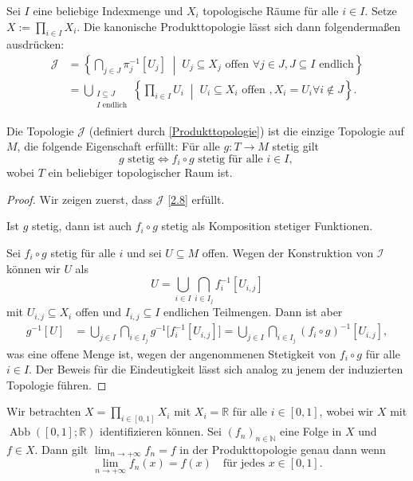\documentclass[
12pt, 
openany, 
a4paper, 
final,
fleqn, 
]{myclass}
\numberwithin{equation}{chapter}
\numberwithin{section}{chapter}
\newcommand{\NN}{\mathbb N}
\newcommand{\RR}{\mathbb R}
\newcommand{\varI}{\mathcal I}
\newcommand{\varJ}{\mathcal J}
\newcommand{\union}{\bigcup}
\newcommand{\intersect}{\bigcap}
\newcommand{\set}[2]{\left\{#1\;\middle|\;#2\right\}}
\DeclareMathOperator{\abb}{Abb}
\begin{document}
\begin{rmk}
Sei $I$ eine beliebige Indexmenge und $X_i$ topologische Räume für alle $i\in I$. Setze $X:= \prod_{i\in I} X_i$. Die kanonische Produkttopologie lässt sich dann folgendermaßen ausdrücken: 
\begin{align*}
\varJ
&
= \set{		\bigcap_{j\in J} \pi_{j}^{-1}[U_{j}]}{U_{j}\subseteq X_{j}\text{ offen }\forall j\in J, J\subseteq I\text{ endlich}}\\
&
= \union_{\substack{I\subseteq J\\\text{$I$ endlich}}}\set{\prod_{i\in I} U_i}{U_i\subseteq X_i \text{ offen }, X_i = U_i \forall i\notin J}.
\end{align*}
\end{rmk}

\begin{thr}\label{2.7}
Die Topologie $\varJ$ (definiert durch \eqref{Produkttopologie}) ist die einzige Topologie auf $M$, die folgende Eigenschaft erfüllt: Für alle $g: T \to M$ stetig gilt 
\begin{equation}\label{2.8}
\text{$g$ stetig} \iff f_{i}\circ g \text{ stetig für alle $i\in I$, }
\end{equation}
wobei $T$ ein beliebiger topologischer Raum ist. 
\end{thr}

\begin{proof}
Wir zeigen zuerst, dass $\varJ$ \eqref{2.8} erfüllt. 

Ist $g$ stetig, dann ist auch $f_i\circ g$ stetig als Komposition stetiger Funktionen. 

Sei $f_i\circ g$ stetig für alle $i$ und sei $U\subseteq M$ offen. Wegen der Konstruktion von $ \varI $ können wir $U$ als 
\[
U = \union_{i\in I} \intersect_{i\in I_{j}} f_{i}^{-1}[U_{i,j}]
\]
mit $ U_{i,j}\subseteq X_{i} $ offen und $ I_{i,j}\subseteq I $ endlichen Teilmengen. Dann ist aber
\begin{align*}
g^{-1}[U] 
&
= \union_{j\in I} \intersect_{i\in I_{j}}g^{-1}\bigg[ f_{i}^{-1}[U_{i,j}]\bigg] =  \union_{j\in I} \intersect_{i\in I_{j}} (f_{i}\circ g)^{-1}[U_{i,j}], 
\end{align*}
was eine offene Menge ist, wegen der angenommenen Stetigkeit von $ f_{i}\circ g $ für alle $i\in I$. Der Beweis für die Eindeutigkeit lässt sich analog zu jenem der induzierten Topologie führen.
\end{proof}

\begin{eg}\label{2.9}
Wir betrachten $X = \prod_{i\in [0,1]} X_i$ mit $X_{i} =\RR$ für alle $i\in [0,1]$, wobei wir $X$ mit $ \abb([0,1]; \RR) $ identifizieren können. Sei $(f_{n})_{n\in \NN}$ eine Folge in $X$ und $f\in X$. Dann gilt $\lim_{n\to+\infty} f_{n} = f$ in der Produkttopologie genau dann wenn 
\[
\lim_{n\to+\infty}f_{n}(x) = f(x) \quad \text{für jedes }x\in [0,1]. 
\]
\end{eg}
\end{document}
